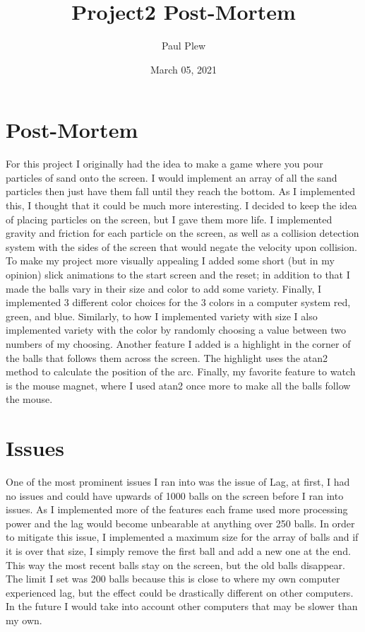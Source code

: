 \documentclass[12 pt]{report}
\title{Project2 Post-Mortem}
\author{Paul Plew}
\date{March 05, 2021}
\begin{document}
\maketitle

\section{Post-Mortem}
\hspace{\parindent} For this project I originally had the idea to make a game where you pour particles of sand onto the screen. I would implement an array of all the sand particles then just have them fall until they reach the bottom. As I implemented this, I thought that it could be much more interesting. I decided to keep the idea of placing particles on the screen, but I gave them more life. I implemented gravity and friction for each particle on the screen, as well as a collision detection system with the sides of the screen that would negate the velocity upon collision. To make my project more visually appealing I added some short (but in my opinion) slick animations to the start screen and the reset; in addition to that I made the balls vary in their size and color to add some variety. Finally, I implemented 3 different color choices for the 3 colors in a computer system red, green, and blue. Similarly, to how I implemented variety with size I also implemented variety with the color by randomly choosing a value between two numbers of my choosing. Another feature I added is a highlight in the corner of the balls that follows them across the screen. The highlight uses the atan2 method to calculate the position of the arc. Finally, my favorite feature to watch is the mouse magnet, where I used atan2 once more to make all the balls follow the mouse. 
\section{Issues}
\hspace{\parindent} One of the most prominent issues I ran into was the issue of Lag, at first, I had no issues and could have upwards of 1000 balls on the screen before I ran into issues. As I implemented more of the features each frame used more processing power and the lag would become unbearable at anything over 250 balls. In order to mitigate this issue, I implemented a maximum size for the array of balls and if it is over that size, I simply remove the first ball and add a new one at the end. This way the most recent balls stay on the screen, but the old balls disappear. The limit I set was 200 balls because this is close to where my own computer experienced lag, but the effect could be drastically different on other computers. In the future I would take into account other computers that may be slower than my own. 
\end{document}
